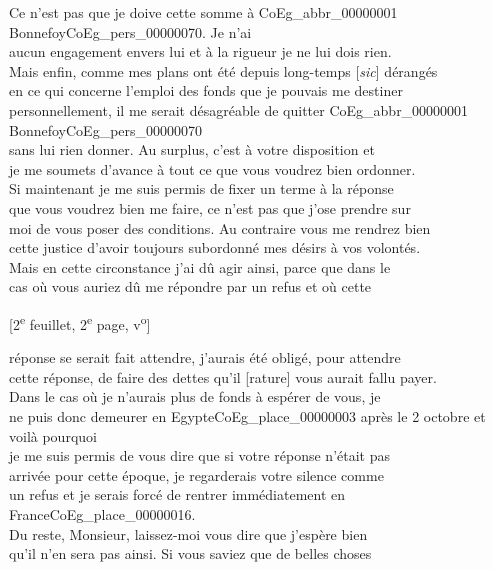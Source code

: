 \documentclass{book}
\begin{document}
Ce n’est pas que je doive cette somme à \gls{CoEg_abbr_00000001} Bonnefoy\gls{CoEg_pers_00000070}. Je n’ai\\
aucun engagement envers lui et à la rigueur je ne lui dois rien.\\
Mais enfin, comme mes plans ont été depuis long-temps [\textit{sic}] dérangés\\
en ce qui concerne l’emploi des fonds que je pouvais me destiner\\
personnellement, il me serait désagréable de quitter \gls{CoEg_abbr_00000001} Bonnefoy\gls{CoEg_pers_00000070}\\
sans lui rien donner. Au surplus, c’est à votre disposition et\\
je me soumets d’avance à tout ce que vous voudrez bien ordonner.\\
\indent Si maintenant je me suis permis de fixer un terme à la réponse\\
que vous voudrez bien me faire, ce n’est pas que j’ose prendre sur\\
moi de vous poser des conditions. Au contraire vous me rendrez bien\\
cette justice d’avoir toujours subordonné mes désirs à vos volontés.\\
Mais en cette circonstance j’ai dû agir ainsi, parce que dans le\\
cas où vous auriez dû me répondre par un refus et où cette
{\footnotesize\begin{center} {[2\textsuperscript{e} feuillet, 2\textsuperscript{e} page, v\textsuperscript{o}]}\end{center}}
\noindent réponse se serait fait attendre, j’aurais été obligé, pour attendre\\
cette réponse, de faire des dettes qu’il [rature] vous aurait fallu payer.\\
Dans le cas où je n’aurais plus de fonds à espérer de vous, je\\
ne puis donc demeurer en Egypte\gls{CoEg_place_00000003} après le 2 octobre et voilà pourquoi\\
je me suis permis de vous dire que si votre réponse n’était pas\\
arrivée pour cette époque, je regarderais votre silence comme\\
un refus et je serais forcé de rentrer immédiatement en France\gls{CoEg_place_00000016}.\\
\indent Du reste, Monsieur, laissez-moi vous dire que j’espère bien\\
qu’il n’en sera pas ainsi. Si vous saviez que de belles choses\\
\end{document}
